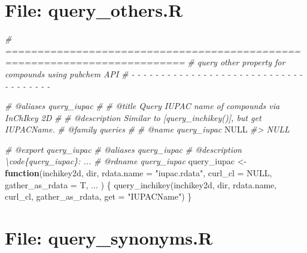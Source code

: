 \documentclass[
]{article}
\newenvironment{Shaded}{\begin{snugshade}}{\end{snugshade}}
\newcommand{\AttributeTok}[1]{\textcolor[rgb]{0.77,0.63,0.00}{#1}}
\newcommand{\CommentTok}[1]{\textcolor[rgb]{0.56,0.35,0.01}{\textit{#1}}}
\newcommand{\ConstantTok}[1]{\textcolor[rgb]{0.00,0.00,0.00}{#1}}
\newcommand{\ControlFlowTok}[1]{\textcolor[rgb]{0.13,0.29,0.53}{\textbf{#1}}}
\newcommand{\FunctionTok}[1]{\textcolor[rgb]{0.00,0.00,0.00}{#1}}
\newcommand{\NormalTok}[1]{#1}
\newcommand{\OtherTok}[1]{\textcolor[rgb]{0.56,0.35,0.01}{#1}}
\newcommand{\StringTok}[1]{\textcolor[rgb]{0.31,0.60,0.02}{#1}}
\begin{document}
\hypertarget{file-query_others.r}{%
\section{File: query\_others.R}\label{file-query_others.r}}

\begin{Shaded}
\begin{Highlighting}[]
\CommentTok{\# ==========================================================================}
\CommentTok{\# query other property for compounds using pubchem API}
\CommentTok{\# {-} {-} {-} {-} {-} {-} {-} {-} {-} {-} {-} {-} {-} {-} {-} {-} {-} {-} {-} {-} {-} {-} {-} {-} {-} {-} {-} {-} {-} {-} {-} {-} {-} {-} {-} {-} {-}}

\CommentTok{\#\textquotesingle{} @aliases query\_iupac}
\CommentTok{\#\textquotesingle{}}
\CommentTok{\#\textquotesingle{} @title Query IUPAC name of compounds via \textquotesingle{}InChIkey 2D\textquotesingle{}}
\CommentTok{\#\textquotesingle{}}
\CommentTok{\#\textquotesingle{} @description Similar to [query\_inchikey()], but get \textquotesingle{}IUPACName\textquotesingle{}.}
\CommentTok{\#\textquotesingle{} @family queries}
\CommentTok{\#\textquotesingle{}}
\CommentTok{\#\textquotesingle{} @name query\_iupac}
\ConstantTok{NULL}
\CommentTok{\#\textgreater{} NULL}

\CommentTok{\#\textquotesingle{} @export query\_iupac}
\CommentTok{\#\textquotesingle{} @aliases query\_iupac}
\CommentTok{\#\textquotesingle{} @description \textbackslash{}code\{query\_iupac\}: ...}
\CommentTok{\#\textquotesingle{} @rdname query\_iupac}
\NormalTok{query\_iupac }\OtherTok{\textless{}{-}}
  \ControlFlowTok{function}\NormalTok{(inchikey2d,}
\NormalTok{    dir,}
    \AttributeTok{rdata.name =} \StringTok{"iupac.rdata"}\NormalTok{,}
    \AttributeTok{curl\_cl =} \ConstantTok{NULL}\NormalTok{,}
    \AttributeTok{gather\_as\_rdata =}\NormalTok{ T,}
\NormalTok{    ...}
\NormalTok{    ) \{}
    \FunctionTok{query\_inchikey}\NormalTok{(inchikey2d, dir, rdata.name, curl\_cl, gather\_as\_rdata,}
      \AttributeTok{get =} \StringTok{"IUPACName"}\NormalTok{)}
\NormalTok{  \}}
\end{Highlighting}
\end{Shaded}

\hypertarget{file-query_synonyms.r}{%
\section{File: query\_synonyms.R}\label{file-query_synonyms.r}}
\end{document}
